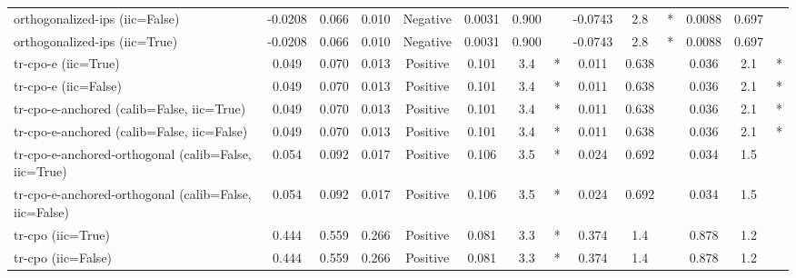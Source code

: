 \begin{table}[htbp]
\begin{tabular}{l|ccccccccccccc}
orthogonalized-ips (iic=False) & -0.0208 & 0.066 & 0.010 & Negative & 0.0031 & 0.900 &  & -0.0743 & 2.8 & * & 0.0088 & 0.697 &  \\
orthogonalized-ips (iic=True) & -0.0208 & 0.066 & 0.010 & Negative & 0.0031 & 0.900 &  & -0.0743 & 2.8 & * & 0.0088 & 0.697 &  \\
tr-cpo-e (iic=True) & 0.049 & 0.070 & 0.013 & Positive & 0.101 & 3.4 & * & 0.011 & 0.638 &  & 0.036 & 2.1 & * \\
tr-cpo-e (iic=False) & 0.049 & 0.070 & 0.013 & Positive & 0.101 & 3.4 & * & 0.011 & 0.638 &  & 0.036 & 2.1 & * \\
tr-cpo-e-anchored (calib=False, iic=True) & 0.049 & 0.070 & 0.013 & Positive & 0.101 & 3.4 & * & 0.011 & 0.638 &  & 0.036 & 2.1 & * \\
tr-cpo-e-anchored (calib=False, iic=False) & 0.049 & 0.070 & 0.013 & Positive & 0.101 & 3.4 & * & 0.011 & 0.638 &  & 0.036 & 2.1 & * \\
tr-cpo-e-anchored-orthogonal (calib=False, iic=True) & 0.054 & 0.092 & 0.017 & Positive & 0.106 & 3.5 & * & 0.024 & 0.692 &  & 0.034 & 1.5 &  \\
tr-cpo-e-anchored-orthogonal (calib=False, iic=False) & 0.054 & 0.092 & 0.017 & Positive & 0.106 & 3.5 & * & 0.024 & 0.692 &  & 0.034 & 1.5 &  \\
tr-cpo (iic=True) & 0.444 & 0.559 & 0.266 & Positive & 0.081 & 3.3 & * & 0.374 & 1.4 &  & 0.878 & 1.2 &  \\
tr-cpo (iic=False) & 0.444 & 0.559 & 0.266 & Positive & 0.081 & 3.3 & * & 0.374 & 1.4 &  & 0.878 & 1.2 &  \\
\bottomrule
\end{tabular}
\end{table}